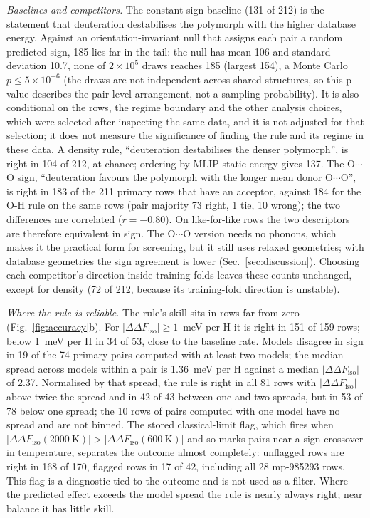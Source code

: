 \documentclass[aps,prmaterials,reprint,superscriptaddress,nofootinbib]{revtex4-2}
\newcommand{\ddF}{\Delta\Delta F_{\mathrm{iso}}}
\begin{document}
\textit{Baselines and competitors.} The constant-sign baseline (131 of 212) is the statement that deuteration destabilises the polymorph with the higher database energy. Against an orientation-invariant null that assigns each pair a random predicted sign, 185 lies far in the tail: the null has mean 106 and standard deviation 10.7, none of $2\times10^5$ draws reaches 185 (largest 154), a Monte Carlo $p \leq 5\times10^{-6}$ (the draws are not independent across shared structures, so this p-value describes the pair-level arrangement, not a sampling probability). It is also conditional on the rows, the regime boundary and the other analysis choices, which were selected after inspecting the same data, and it is not adjusted for that selection; it does not measure the significance of finding the rule and its regime in these data. A density rule, ``deuteration destabilises the denser polymorph'', is right in 104 of 212, at chance; ordering by MLIP static energy gives 137. The O$\cdots$O sign, ``deuteration favours the polymorph with the longer mean donor O$\cdots$O'', is right in 183 of the 211 primary rows that have an acceptor, against 184 for the O-H rule on the same rows (pair majority 73 right, 1 tie, 10 wrong); the two differences are correlated ($r = -0.80$). On like-for-like rows the two descriptors are therefore equivalent in sign. The O$\cdots$O version needs no phonons, which makes it the practical form for screening, but it still uses relaxed geometries; with database geometries the sign agreement is lower (Sec.~\ref{sec:discussion}). Choosing each competitor's direction inside training folds leaves these counts unchanged, except for density (72 of 212, because its training-fold direction is unstable).

\textit{Where the rule is reliable.} The rule's skill sits in rows far from zero (Fig.~\ref{fig:accuracy}b). For $|\ddF|\geq1$~meV per H it is right in 151 of 159 rows; below 1~meV per H in 34 of 53, close to the baseline rate. Models disagree in sign in 19 of the 74 primary pairs computed with at least two models; the median spread across models within a pair is 1.36~meV per H against a median $|\ddF|$ of 2.37. Normalised by that spread, the rule is right in all 81 rows with $|\ddF|$ above twice the spread and in 42 of 43 between one and two spreads, but in 53 of 78 below one spread; the 10 rows of pairs computed with one model have no spread and are not binned. The stored classical-limit flag, which fires when $|\ddF(2000~\mathrm{K})| > |\ddF(600~\mathrm{K})|$ and so marks pairs near a sign crossover in temperature, separates the outcome almost completely: unflagged rows are right in 168 of 170, flagged rows in 17 of 42, including all 28 mp-985293 rows. This flag is a diagnostic tied to the outcome and is not used as a filter. Where the predicted effect exceeds the model spread the rule is nearly always right; near balance it has little skill.
\end{document}

